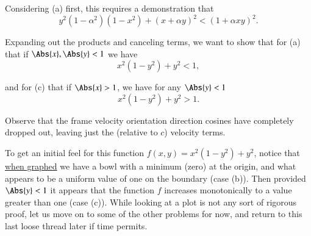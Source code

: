 {Considering (a) first, this requires a demonstration that
%
\begin{equation}\label{eqn:relativisticElectrodynamicsA1:280}
y^2 (1 - \alpha^2)(1 - x^2) + (x + \alpha y)^2 < (1 + \alpha x y)^2 .
\end{equation}

Expanding out the products and canceling terms, we want to show that for (a) that if \(\Abs{x},\Abs{y} < 1\) we have
%
\begin{equation}\label{eqn:relativisticElectrodynamicsA1:290a}
x^2 (1 - y^2) + y^2 < 1,
\end{equation}

and for (c) that if \(\Abs{x} > 1\), we have for any \(\Abs{y} < 1\)
%
\begin{equation}\label{eqn:relativisticElectrodynamicsA1:290c}
x^2 (1 - y^2) + y^2 > 1.
\end{equation}

Observe that the frame velocity orientation direction cosines have completely dropped out, leaving just the (relative to \(c\)) velocity terms.

To get an initial feel for this function \(f(x,y) = x^2 (1 - y^2) + y^2\), notice that \href{http://goo.gl/5AnNF}{when graphed} we have a bowl with a minimum (zero) at the origin, and what appears to be a uniform value of one on the boundary (case (b)).  Then provided \(\Abs{y} < 1\) it appears that the function \(f\) increases monotonically to a value greater than one (case (c)).  While looking at a plot is not any sort of rigorous proof, let us move on to some of the other problems for now, and return to this last loose thread later if time permits.


} %


